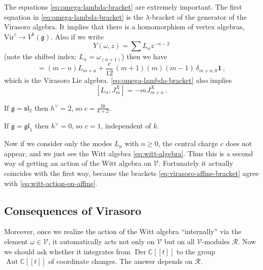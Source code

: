 \documentclass[12pt,letterpaper,reqno]{amsart}
\makeatletter
\numberwithin{equation}{section}
\newcommand{\fg}{{\mathfrak g}}
\newcommand{\fgl}{{\mathfrak {gl}}}
\newcommand{\fsl}{{\mathfrak {sl}}}
\newcommand{\Vir}{{\mathrm{Vir}}}
\newcommand{\Derdisc}{\ensuremath{\Der \bbC[[t]]}}
\newcommand{\Autdisc}{\ensuremath{\Aut \bbC[[t]]}}
\newcommand{\bbC}{\ensuremath{\mathbb C}}
\DeclareRobustCommand{\nop}[1]{\mathpalette\nop@{#1}}
\newcommand{\nop@}[2]{%
  \mathinner{%
    \mkern0.4mu:\mkern0.4mu #2 \mkern0.4mu:\mkern0.4mu%
  }%
}
\newcommand\bid{{\mathbf 1}}
\newcommand{\vertex}{\mathcal{V}}
\newcommand{\vrep}{\mathcal{R}}
\DeclareMathOperator{\Aut}{Aut}
\DeclareMathOperator{\Der}{Der}
\makeatother
\begin{document}

The equations \eqref{eq:omega-lambda-bracket} are extremely important.
The first equation in \eqref{eq:omega-lambda-bracket} is the $\lambda$-bracket of the generator of the 
Virasoro algebra. It implies that there is a homomorphism of vertex algebras, $\Vir^c \to V^k(\fg)$.
Also if we write
\begin{equation}
  Y(\omega,z) = \sum L_n z^{-n-2}
\end{equation}
(note the shifted index: $L_n = \omega_{(n+1)}$)
then we have
\begin{equation}
  [L_m, L_n] = (m-n) L_{m+n} + \frac{c}{12}\,(m+1)(m)(m-1)\,\delta_{m+n,0} \bid \, ,
\end{equation}
which is the Virasoro Lie algebra.
\eqref{eq:omega-lambda-bracket} also implies
\begin{equation} \label{eq:virasoro-affine-bracket}
  [L_n, J^X_m] = -m J^X_{m+n} \, .
\end{equation}

\begin{example} If $\fg = \fsl_2$ then $h^\vee = 2$, so $c = \frac{3k}{k+2}$.
\end{example}

\begin{example} If $\fg = \fgl_1$ then $h^\vee = 0$, so $c = 1$, independent of $k$.
\end{example}

Now if we consider only the modes $L_n$ with $n \ge 0$, the central charge $c$ does not appear, and
we just see the Witt algebra \eqref{eq:witt-algebra}.
Thus this is a second way of getting an action of the Witt algebra on $\vertex$.
Fortunately it actually coincides with the first way, because the brackets \eqref{eq:virasoro-affine-bracket}
agree with \eqref{eq:witt-action-on-affine}.


\subsection{Consequences of Virasoro}

Moreover, once we realize the action of the Witt algebra ``internally'' via the element $\omega \in \vertex$,
it automatically acts not only on $\vertex$ but on all $\vertex$-modules $\vrep$.
Now we should ask whether it integrates from $\Derdisc$ to the group $\Autdisc$ of coordinate changes.
The answer  depends on $\vrep$.
\end{document}

